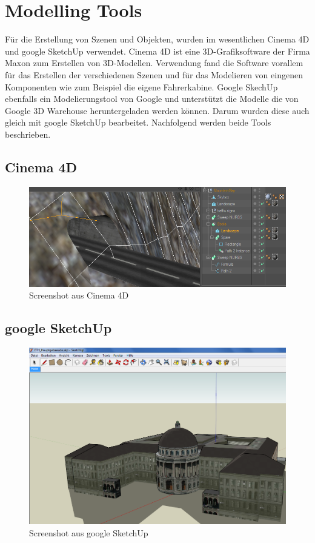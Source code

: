 \section{Modelling Tools}
Für die Erstellung von Szenen und Objekten, wurden im wesentlichen Cinema 4D und google SketchUp verwendet. Cinema 4D ist eine 3D-Grafiksoftware der Firma Maxon zum Erstellen von 3D-Modellen. Verwendung fand die Software vorallem für das Erstellen der verschiedenen Szenen und für das Modelieren von eingenen Komponenten wie zum Beispiel die eigene Fahrerkabine. Google SkechUp ebenfalls ein Modelierungstool von Google und unterstützt die Modelle die von Google 3D Warehouse heruntergeladen werden können. Darum wurden diese auch gleich mit google SketchUp bearbeitet. Nachfolgend werden beide Tools beschrieben.
\subsection{Cinema 4D}
\label{cinema4d}
\begin{figure}[H]
\centering 
\includegraphics[width=1\linewidth]{src/screenshot_cinema4d.png}
\caption{Screenshot aus Cinema 4D} %
\label{screenshot_cinema4d} %
\end{figure}
\subsection{google SketchUp}\begin{figure}[H]
\centering 
\includegraphics[width=1\linewidth]{src/screenshot_googlesketchup.png}
\caption{Screenshot aus google SketchUp} %
\label{screenshot_googlesketchup} %
\end{figure}